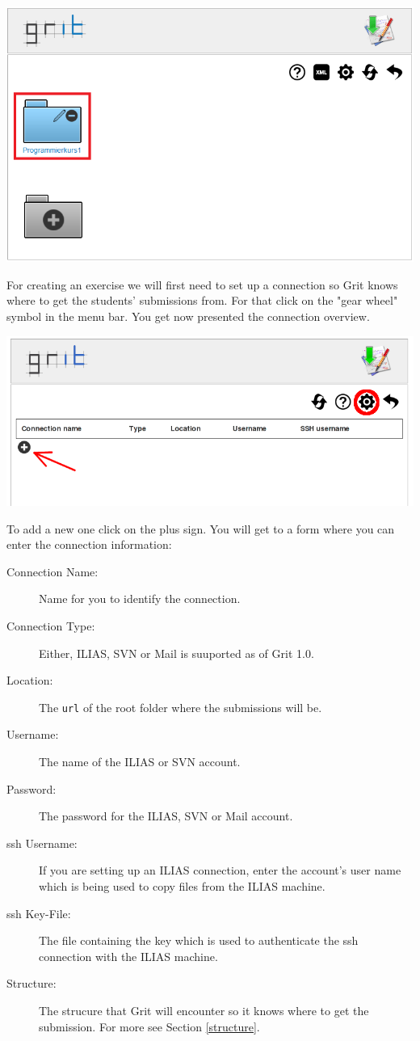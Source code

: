 \documentclass[10pt,a4paper, titlepage, toc=idx]{scrreprt}
\theoremstyle{definition}
\theoremstyle{plain}
\newcommand*{\product}{Grit}
\newcommand*{\version}{1.0}
\begin{document}
	\begin{center}
          \includegraphics[width=.55\textwidth]{pictures/created_course.png}
	\end{center}For creating an exercise we will first need to set
        up a connection so \product{} knows where to get the students'
        submissions from. For that click on the "gear wheel" symbol in
        the menu bar. You get now presented the connection overview.
	\begin{center}
          \includegraphics[width=.55\textwidth]{pictures/connection_overview.png}
	\end{center}
	To add a new one click on the plus sign. You will get to a
        form where you can enter the connection information:
	\begin{description}
        \item[Connection Name:] Name for you to identify the
          connection.
        \item[Connection Type:] Either, ILIAS, SVN or Mail is
          suuported as of \product{} \version.
        \item[Location:] The {\tt url} of the root folder where the
          submissions will be.
        \item[Username:] The name of the ILIAS or SVN account.
        \item[Password:] The password for the ILIAS, SVN or Mail
          account.
        \item[ssh Username:] If you are setting up an ILIAS
          connection, enter the account's user name which is being
          used to copy files from the ILIAS machine.
        \item[ssh Key-File:] The file containing the key which is used
          to authenticate the ssh connection with the ILIAS machine.
        \item[Structure:] The strucure that \product{} will encounter
          so it knows where to get the submission. For more see
          Section \ref{structure}.
	\end{description}
\end{document}
